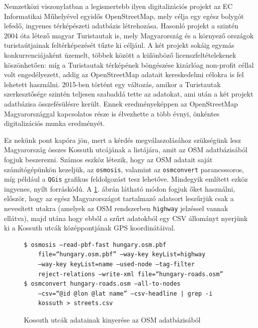 \documentclass[a5paper,10pt]{article}
\begin{document}
\bigskip

Nemzetközi viszonylatban a legismertebb ilyen digitalizációs projekt az EC Informatikai Műhelyével egyidős OpenStreetMap\cite{osm}, mely célja egy egész bolygót lefedő, ingyenes térképészeti adatbázis létrehozása. Hasonló projekt a szintén 2004 óta létező magyar Turistautak\cite{turistautak} is, mely Magyarország és a környező országok turistaútjainak feltérképezését tűzte ki céljául. A két projekt sokáig egymás konkurrenciájaként üzemelt, többek között a különböző licenszfeltételekenek köszönhetően: míg a Turistautak térképének böngészése kizárlóag non-profit céllal volt engedélyezett, addig az OpenStreetMap adatait kereskedelmi célokra is fel lehetett használni. 2015-ben történt egy változás, amikor a Turistautak szerkesztősége szintén teljesen szabaddá tette az adatokat, ami után a két projekt adatbázisa  összefésülésre került. Ennek eredményeképpen az OpenStreetMap Magyarországgal kapcsolatos része is élvezhette a több évnyi, önkéntes digitalizációs munka eredményét.

\bigskip

Ez nekünk pont kapóra jön, mert a kérdés megválaszolásához szükségünk lesz Magyarország összes Kossuth utcájának a listájára, amit az OSM adatbázisából fogjuk beszerezni. Számos eszköz létezik, hogy az OSM adatait saját számítógépünkön kezeljük, az \texttt{osmosis}, valamint az \texttt{osmconvert} parancsssoros, míg például a \texttt{QGis} grafikus feldolgozást tesz lehetőve. Mindegyik említett ezköz ingyenes, nyílt forráskódú. A \ref{osmextract}. ábrán látható módon fogjuk őket használni, először, hogy az egész Magyarországot tartalmazó adatsort leszűrjük csak a nevesített utakra (amelyek az OSM rendszerben \texttt{highway} jelzéssel vannak ellátva), majd utána hogy ebből a szűrt adatokból egy CSV állományt nyerjünk ki a Kossuth utcák középpontjának GPS koordinátáival.

\begin{figure}[!htbp]
    \centering
    \begin{verbatim}$ osmosis –read-pbf-fast hungary.osm.pbf
    file=“hungary.osm.pbf” –way-key keyList=highway
    –way-key keyList=name –used-node –tag-filter
    reject-relations –write-xml file=“hungary-roads.osm”
$ osmconvert hungary-roads.osm –all-to-nodes
    –csv=“@id @lon @lat name” –csv-headline | grep -i
    kossuth > streets.csv\end{verbatim}
    \caption{Kossuth utcák adatainak kinyerése az OSM adatbázisából}
    \label{osmextract}
\end{figure}
\end{document}
